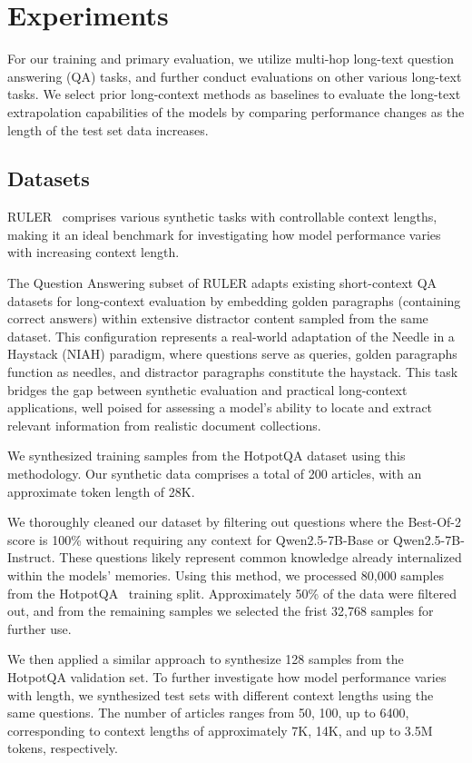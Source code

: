 \section{Experiments}

For our training and primary evaluation, we utilize multi-hop long-text question answering (QA) tasks, and further conduct evaluations on other various long-text tasks. We select prior long-context methods as baselines to evaluate the long-text extrapolation capabilities of the models by comparing performance changes as the length of the test set data increases.

\subsection{Datasets}

RULER~\cite{hsieh2024ruler} comprises various synthetic tasks with controllable context lengths, making it an ideal benchmark for investigating how model performance varies with increasing context length. 

The Question Answering subset of RULER adapts existing short-context QA datasets for long-context evaluation by embedding golden paragraphs (containing correct answers) within extensive distractor content sampled from the same dataset. This configuration represents a real-world adaptation of the Needle in a Haystack (NIAH) paradigm, where questions serve as queries, golden paragraphs function as needles, and distractor paragraphs constitute the haystack. This task bridges the gap between synthetic evaluation and practical long-context applications, well poised for assessing a model’s ability to locate and extract relevant information from realistic document collections.

We synthesized training samples from the HotpotQA dataset using this methodology. Our synthetic data comprises a total of 200 articles, with an approximate token length of 28K. 

We thoroughly cleaned our dataset by filtering out questions where the Best-Of-2 score is 100\%  without requiring any context for Qwen2.5-7B-Base or Qwen2.5-7B-Instruct. These questions likely represent common knowledge already internalized within the models' memories. Using this method, we processed 80,000 samples from the HotpotQA~\cite{yang2018hotpotqa} training split. Approximately 50\% of the data were filtered out, and from the remaining samples we selected the frist 32,768 samples for further use.

We then applied a similar approach to synthesize 128 samples from the HotpotQA validation set. To further investigate how model performance varies with length, we synthesized test sets with different context lengths using the same questions. The number of articles ranges from 50, 100, up to 6400, corresponding to context lengths of approximately 7K, 14K, and up to 3.5M tokens, respectively.


